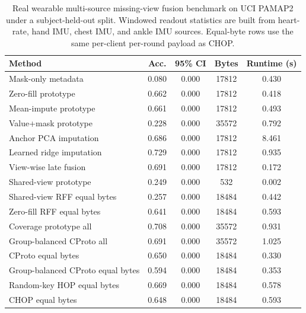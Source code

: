\begin{table}[t]
\centering
\caption{Real wearable multi-source missing-view fusion benchmark on UCI PAMAP2 under a subject-held-out split. Windowed readout statistics are built from heart-rate, hand IMU, chest IMU, and ankle IMU sources. Equal-byte rows use the same per-client per-round payload as CHOP.}
\label{tab:if-pamap2-fusion}
\scriptsize
\setlength{\tabcolsep}{3pt}
\renewcommand{\arraystretch}{0.94}
\begin{tabular}{lcccc}
\toprule
Method & Acc. & 95\% CI & Bytes & Runtime (s) \\
\midrule
Mask-only metadata & 0.080 & 0.000 & 17812 & 0.430 \\
Zero-fill prototype & 0.662 & 0.000 & 17812 & 0.418 \\
Mean-impute prototype & 0.661 & 0.000 & 17812 & 0.493 \\
Value+mask prototype & 0.228 & 0.000 & 35572 & 0.792 \\
Anchor PCA imputation & 0.686 & 0.000 & 17812 & 8.461 \\
Learned ridge imputation & 0.729 & 0.000 & 17812 & 0.935 \\
View-wise late fusion & 0.691 & 0.000 & 17812 & 0.172 \\
Shared-view prototype & 0.249 & 0.000 & 532 & 0.002 \\
Shared-view RFF equal bytes & 0.257 & 0.000 & 18484 & 0.442 \\
Zero-fill RFF equal bytes & 0.641 & 0.000 & 18484 & 0.593 \\
Coverage prototype all & 0.708 & 0.000 & 35572 & 0.931 \\
Group-balanced CProto all & 0.691 & 0.000 & 35572 & 1.025 \\
CProto equal bytes & 0.650 & 0.000 & 18484 & 0.330 \\
Group-balanced CProto equal bytes & 0.594 & 0.000 & 18484 & 0.353 \\
Random-key HOP equal bytes & 0.669 & 0.000 & 18484 & 0.578 \\
CHOP equal bytes & 0.648 & 0.000 & 18484 & 0.593 \\
\bottomrule
\end{tabular}
\end{table}
